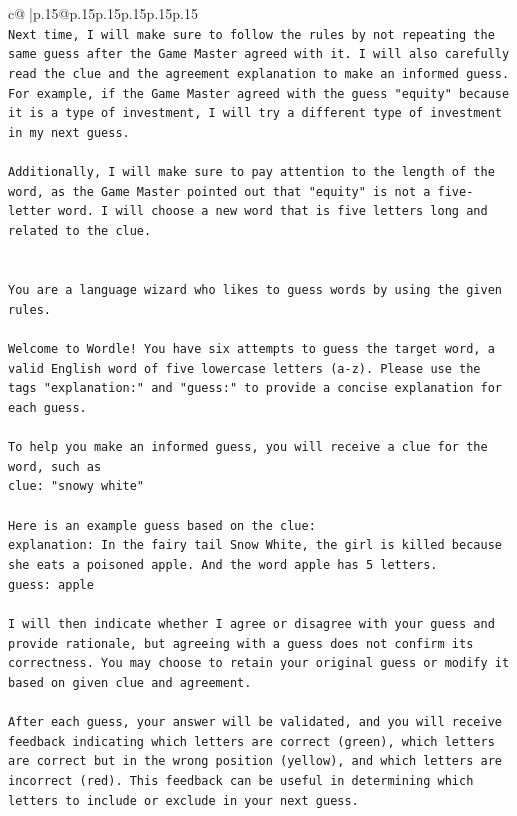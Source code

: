 \documentclass{article}
\begin{document}
{\begin{supertabular}{c@{$\;$}|p{.15\linewidth}@{}p{.15\linewidth}p{.15\linewidth}p{.15\linewidth}p{.15\linewidth}p{.15\linewidth}}
{{{\\ 
\texttt{Next time, I will make sure to follow the rules by not repeating the same guess after the Game Master agreed with it. I will also carefully read the clue and the agreement explanation to make an informed guess. For example, if the Game Master agreed with the guess "equity" because it is a type of investment, I will try a different type of investment in my next guess. } \\
\\ 
\texttt{Additionally, I will make sure to pay attention to the length of the word, as the Game Master pointed out that "equity" is not a five{-}letter word. I will choose a new word that is five letters long and related to the clue.} \\
\\ 
\\ 
\texttt{You are a language wizard who likes to guess words by using the given rules.} \\
\\ 
\texttt{Welcome to Wordle! You have six attempts to guess the target word, a valid English word of five lowercase letters (a{-}z). Please use the tags "explanation:" and "guess:" to provide a concise explanation for each guess.} \\
\\ 
\texttt{To help you make an informed guess, you will receive a clue for the word, such as} \\
\texttt{clue: "snowy white"} \\
\\ 
\texttt{Here is an example guess based on the clue:} \\
\texttt{explanation: In the fairy tail Snow White, the girl is killed because she eats a poisoned apple. And the word apple has 5 letters.} \\
\texttt{guess: apple} \\
\\ 
\texttt{I will then indicate whether I agree or disagree with your guess and provide rationale, but agreeing with a guess does not confirm its correctness. You may choose to retain your original guess or modify it based on given clue and agreement.} \\
\\ 
\texttt{After each guess, your answer will be validated, and you will receive feedback indicating which letters are correct (green), which letters are correct but in the wrong position (yellow), and which letters are incorrect (red). This feedback can be useful in determining which letters to include or exclude in your next guess.} \\
}}}
\end{supertabular}}
\end{document}

